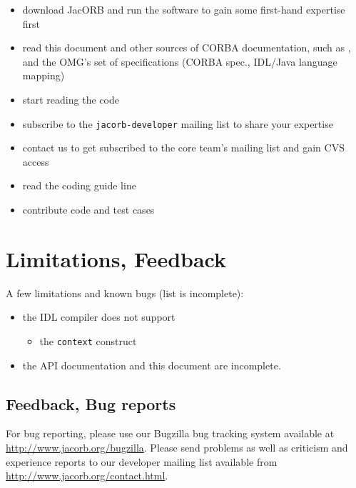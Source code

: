 \begin{itemize}
\item download JacORB and run the software to gain some first-hand
  expertise first 
\item read this document and other sources of CORBA documentation,
  such as \cite{Brose2001a}, and the OMG's set of specifications
  (CORBA spec., IDL/Java language mapping)
\item start reading the code
\item subscribe to the {\tt jacorb-developer} mailing list to share
  your expertise
\item contact us to get subscribed to the core team's mailing list and
  gain CVS access
\item read the coding guide line
\item contribute code and test cases
\end{itemize}

\section{Limitations, Feedback}

A few limitations and known bugs (list is incomplete):

\begin{itemize}
    \item the IDL compiler does not support
    \begin{itemize}
        \item the {\tt context} construct
    \end{itemize}
    \item the API documentation and this document are incomplete.
\end{itemize}

\subsection{Feedback, Bug reports}

For bug reporting, please use our Bugzilla bug tracking system available at
\href{http://www.jacorb.org/bugzilla}{http://www.jacorb.org/bugzilla}.  Please
send problems as well as criticism and experience reports to our developer
mailing list available from
\href{http://www.jacorb.org/contact.html}{http://www.jacorb.org/contact.html}. 



